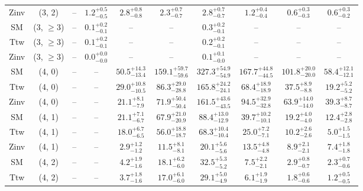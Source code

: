 \begin{table}[h!]
{\begin{tabular}{cccccccccc}
	Zinv & (3, 2) & -- & $1.2^{+ 0.5 }_{- 0.5 }$ & $2.8^{+ 0.8 }_{- 0.8 }$ & $2.3^{+ 0.7 }_{- 0.7 }$ & $2.8^{+ 0.7 }_{- 0.7 }$ & $1.2^{+ 0.4 }_{- 0.4 }$ & $0.6^{+ 0.3 }_{- 0.3 }$ & $0.6^{+ 0.3 }_{- 0.2 }$ \\[0.5ex] 
	SM & (3, $\ge3$) & -- & $0.1^{+ 0.2 }_{- 0.1 }$ & -- & -- & $0.3^{+ 0.2 }_{- 0.1 }$ & -- & -- & -- \\[0.5ex] 
	Ttw & (3, $\ge3$) & -- & $0.1^{+ 0.2 }_{- 0.1 }$ & -- & -- & $0.2^{+ 0.2 }_{- 0.1 }$ & -- & -- & -- \\[0.5ex] 
	Zinv & (3, $\ge3$) & -- & $0.0^{+ 0.0 }_{- 0.0 }$ & -- & -- & $0.1^{+ 0.1 }_{- 0.0 }$ & -- & -- & -- \\[0.5ex] 
	SM & (4, 0) & -- & -- & $50.5^{+ 14.3 }_{- 13.4 }$ & $159.1^{+ 59.7 }_{- 59.6 }$ & $327.3^{+ 54.9 }_{- 54.9 }$ & $167.7^{+ 44.8 }_{- 44.5 }$ & $101.8^{+ 20.0 }_{- 20.0 }$ & $58.4^{+ 12.1 }_{- 12.1 }$ \\[0.5ex] 
	Ttw & (4, 0) & -- & -- & $29.0^{+ 10.8 }_{- 10.5 }$ & $86.3^{+ 29.0 }_{- 28.8 }$ & $165.8^{+ 24.2 }_{- 24.1 }$ & $68.4^{+ 18.9 }_{- 18.9 }$ & $37.5^{+ 8.9 }_{- 8.8 }$ & $19.2^{+ 5.2 }_{- 5.2 }$ \\[0.5ex] 
	Zinv & (4, 0) & -- & -- & $21.1^{+ 8.1 }_{- 7.9 }$ & $71.9^{+ 50.4 }_{- 50.4 }$ & $161.5^{+ 43.6 }_{- 43.5 }$ & $94.5^{+ 32.9 }_{- 32.8 }$ & $63.9^{+ 14.0 }_{- 14.0 }$ & $39.3^{+ 8.7 }_{- 8.7 }$ \\[0.5ex] 
	SM & (4, 1) & -- & -- & $21.1^{+ 7.1 }_{- 6.7 }$ & $67.9^{+ 21.0 }_{- 20.9 }$ & $88.4^{+ 13.0 }_{- 12.9 }$ & $39.7^{+ 10.2 }_{- 10.1 }$ & $19.2^{+ 4.0 }_{- 4.0 }$ & $12.4^{+ 2.8 }_{- 2.8 }$ \\[0.5ex] 
	Ttw & (4, 1) & -- & -- & $18.0^{+ 6.7 }_{- 6.5 }$ & $56.0^{+ 18.8 }_{- 18.7 }$ & $68.3^{+ 10.4 }_{- 10.4 }$ & $25.0^{+ 7.2 }_{- 7.1 }$ & $10.2^{+ 2.6 }_{- 2.6 }$ & $5.0^{+ 1.5 }_{- 1.5 }$ \\[0.5ex] 
	Zinv & (4, 1) & -- & -- & $2.9^{+ 1.2 }_{- 1.2 }$ & $11.5^{+ 8.1 }_{- 8.1 }$ & $20.1^{+ 5.6 }_{- 5.6 }$ & $13.5^{+ 4.8 }_{- 4.8 }$ & $8.9^{+ 2.1 }_{- 2.1 }$ & $7.4^{+ 1.8 }_{- 1.8 }$ \\[0.5ex] 
	SM & (4, 2) & -- & -- & $4.2^{+ 1.9 }_{- 1.6 }$ & $18.1^{+ 6.2 }_{- 6.0 }$ & $32.5^{+ 5.3 }_{- 5.2 }$ & $7.5^{+ 2.2 }_{- 2.1 }$ & $2.9^{+ 0.8 }_{- 0.7 }$ & $2.3^{+ 0.7 }_{- 0.6 }$ \\[0.5ex] 
	Ttw & (4, 2) & -- & -- & $3.7^{+ 1.8 }_{- 1.6 }$ & $17.0^{+ 6.1 }_{- 6.0 }$ & $29.1^{+ 5.0 }_{- 4.9 }$ & $6.1^{+ 1.9 }_{- 1.9 }$ & $1.8^{+ 0.6 }_{- 0.6 }$ & $1.2^{+ 0.5 }_{- 0.5 }$ \\[0.5ex] 

\end{tabular}}
\end{table}
